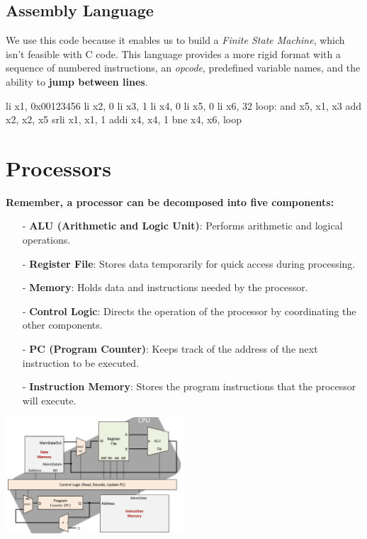 \subsection{Assembly Language}
We use this code because it enables us to build a \textit{Finite State Machine}, which isn't feasible with C code. This language provides a more rigid format with a sequence of numbered instructions, an \textit{opcode}, predefined variable names, and the ability to \textbf{jump between lines}.
\newpage
\begin{center}
    \begin{assembly}
    li x1, 0x00123456
    li x2, 0
    li x3, 1
    li x4, 0
    li x5, 0
    li x6, 32
loop: and x5, x1, x3
    add x2, x2, x5
    srli x1, x1, 1
    addi x4, x4, 1
    bne x4, x6, loop
    \end{assembly}
\end{center}

\section{Processors}
\textbf{Remember, a processor can be decomposed into five components:} \newline
\begin{itemize}[noitemsep]
    \item[-] \textbf{ALU (Arithmetic and Logic Unit)}: Performs arithmetic and logical operations.
    \item[-] \textbf{Register File}: Stores data temporarily for quick access during processing.
    \item[-] \textbf{Memory}: Holds data and instructions needed by the processor.
    \item[-] \textbf{Control Logic}: Directs the operation of the processor by coordinating the other components.
    \item[-] \textbf{PC (Program Counter)}: Keeps track of the address of the next instruction to be executed.
    \item[-] \textbf{Instruction Memory}: Stores the program instructions that the processor will execute.
\end{itemize}
\begin{center}
    \includegraphics[width=0.5\textwidth]{chapters/chapter1a/images/processor.png}
\end{center}

